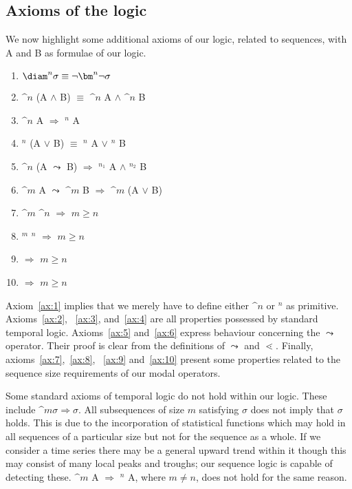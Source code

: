 \subsection{Axioms of the logic}

We now highlight some additional axioms of our logic, related to
sequences, with A and B as formulae of our logic.

\begin{enumerate}
\item\label{ax:1} $\mbox{\diam}^n \sigma \equiv \neg \bm^n \neg \sigma$
\item\label{ax:2} $\bm^n$ (A $\wedge$ B) $\equiv$ $\bm^n$ A $\wedge$ $\bm^n$ B
\item\label{ax:3} $\bm^n$ A $\Rightarrow$ \diam$^n$ A
\item\label{ax:4} \diam$^n$ (A $\vee$ B) $\equiv$ \diam$^n$ A $\vee$ \diam$^n$ B
\item\label{ax:5} $\bm^n$ (A $\leadsto$ B) $\Rightarrow$ \diam$^{n_1}$ A $\wedge$
\diam$^{n_2}$ B
\item\label{ax:6}  $\bm^m$ A $\leadsto$ $\bm^m$ B $\Rightarrow$ $\bm^m$ (A $\vee$ B)
\item\label{ax:7} $\bm^m$ $\bm^n$ $\Rightarrow$ $m \ge n$
\item\label{ax:8} \diam$^m$ \diam$^n$ $\Rightarrow$ $m \ge n$
\item\label{ax:9}  $\Rightarrow$ $m \ge n$
\item\label{ax:10}  $\Rightarrow$ $m \ge n$
\end{enumerate}

Axiom~\ref{ax:1} implies that we merely have to define either $\bm^n$
or \diam$^n$ as primitive. Axioms~\ref{ax:2}, ~\ref{ax:3},
and~\ref{ax:4} are all properties possessed by standard temporal
logic. Axioms~\ref{ax:5} and~\ref{ax:6} express behaviour concerning
the $\leadsto$ operator. Their proof is clear from the definitions of
$\leadsto$ and $\lessdot$. Finally, axioms~\ref{ax:7},~\ref{ax:8}, ~\ref{ax:9} and~\ref{ax:10}
present some properties related to the sequence size requirements of our modal
operators.  

\medskip

Some standard axioms of temporal logic do not hold within our
logic. These include $\bm^{m} \sigma \Rightarrow \sigma$. All
subsequences of size $m$ satisfying $\sigma$ does not imply that
$\sigma$ holds. This is due to the incorporation of statistical
functions which may hold in all sequences of a particular size but not
for the sequence as a whole. If we consider a time series there may be
a general upward trend within it though this may consist of many
local peaks and troughs; our sequence logic is capable of detecting
these. $\bm^m$ A $\Rightarrow$ \diam$^n$ A, where $m \not= n$, does
not hold for the same reason.

